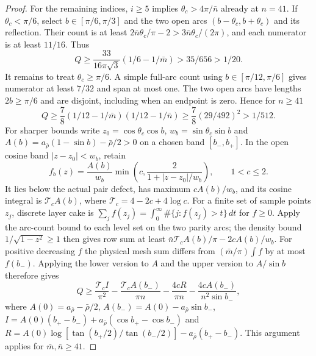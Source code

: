 \begin{proof}
For the remaining indices, $i\geq5$ implies $\theta_c>4\pi/\bar{n}$ already
at $n=41$.  If $\theta_c<\pi/6$, select $b\in[\pi/6,\pi/3]$ and the
two open arcs $(b-\theta_c,b+\theta_c)$ and its reflection.  Their count
is at least $2\bar{n}\theta_c/\pi-2>3\bar{n}\theta_c/(2\pi)$, and each numerator is
at least $11/16$.  Thus
\[
 Q\geq\frac{33}{16\pi\sqrt3}(1/6-1/\bar{m})>35/656>1/20.
\]
It remains to treat $\theta_c\geq\pi/6$.  A simple full-arc count using
$b\in[\pi/12,\pi/6]$ gives numerator at least $7/32$ and span at most
one.  The two open arcs have lengths $2b\geq\pi/6$ and are disjoint,
including when an endpoint is zero.  Hence for $n\geq41$
\begin{equation}\label{ul:full-arc-floor}
 Q\geq\frac78(1/12-1/\bar{m})(1/12-1/\bar{n})
 \geq\frac78(29/492)^2>1/512.
\end{equation}
For sharper bounds write $z_0=\cos\theta_c\cos b$,
$w_b=\sin\theta_c\sin b$ and $A(b)=a_{\bar{\rho}}(1-\sin b)-\bar{\rho}/2>0$ on a chosen
band $[b_-,b_+]$.  In the open cosine band $|z-z_0|<w_b$, retain
\[
 f_b(z)=\frac{A(b)}{w_b}
       \min\left(c,\frac2{1+|z-z_0|/w_b}\right),\qquad 1<c\leq2.
\]
It lies below the actual pair defect, has maximum $cA(b)/w_b$, and
its cosine integral is $\mathcal T_cA(b)$, where
$\mathcal T_c=4-2c+4\log c$.  For a finite set of sample points $z_j$, discrete layer cake is
$\sum_j f(z_j)=\int_0^\infty\#\{j:f(z_j)>t\}\,dt$ for $f\geq0$.
Apply the arc-count bound to each level set on the two parity arcs;
the density bound
$1/\sqrt{1-z^2}\geq1$ then gives row sum at least
$\bar{n}\mathcal T_cA(b)/\pi-2cA(b)/w_b$.
For positive decreasing $f$ the physical mesh sum differs from
$(\bar{m}/\pi)\int f$ by at most $f(b_-)$.  Applying the lower version to
$A$ and the upper version to $A/\sin b$ therefore gives
\begin{equation}\label{ul:band-formula}
 Q\geq\frac{\mathcal T_c I}{\pi^2}
       -\frac{\mathcal T_c A(b_-)}{\pi n}
       -\frac{4cR}{\pi n}-\frac{4cA(b_-)}{n^2\sin b_-},
\end{equation}
where $A(0)=a_{\bar{\rho}}-\bar{\rho}/2$, $A(b_-)=A(0)-a_{\bar{\rho}}\sin b_-$,
$I=A(0)(b_+-b_-)+a_{\bar{\rho}}(\cos b_+-\cos b_-)$ and
$R=A(0)\log[\tan(b_+/2)/\tan(b_-/2)]-a_{\bar{\rho}}(b_+-b_-)$.
This argument applies for $\bar{m},\bar{n}\geq41$.


\end{proof}
